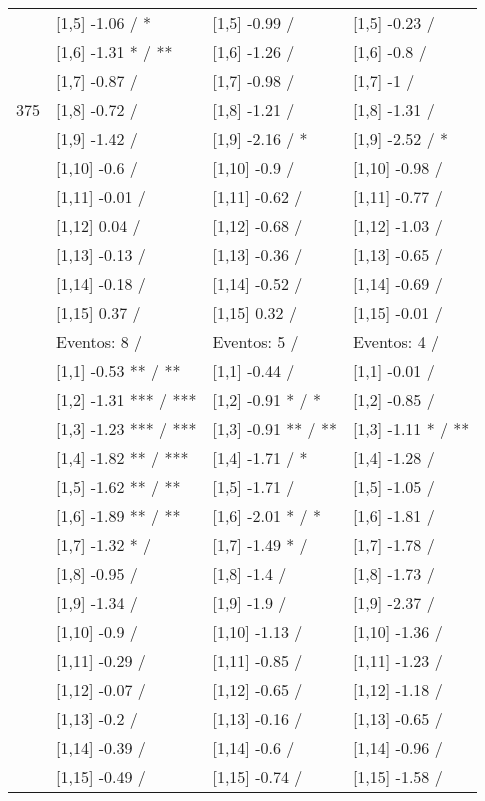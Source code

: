 \begin{table}
\begin{tabular}[t]{llll}
 & {}[1,5] -1.06  / * & {}[1,5] -0.99  / & {}[1,5] -0.23  /\\
 & {}[1,6] -1.31 * / ** & {}[1,6] -1.26  / & {}[1,6] -0.8  /\\
 & {}[1,7] -0.87  / & {}[1,7] -0.98  / & {}[1,7] -1  /\\
375 & {}[1,8] -0.72  / & {}[1,8] -1.21  / & {}[1,8] -1.31  /\\
\addlinespace
 & {}[1,9] -1.42  / & {}[1,9] -2.16  / * & {}[1,9] -2.52  / *\\
 & {}[1,10] -0.6  / & {}[1,10] -0.9  / & {}[1,10] -0.98  /\\
 & {}[1,11] -0.01  / & {}[1,11] -0.62  / & {}[1,11] -0.77  /\\
 & {}[1,12] 0.04  / & {}[1,12] -0.68  / & {}[1,12] -1.03  /\\
 & {}[1,13] -0.13  / & {}[1,13] -0.36  / & {}[1,13] -0.65  /\\
\addlinespace
 & {}[1,14] -0.18  / & {}[1,14] -0.52  / & {}[1,14] -0.69  /\\
 & {}[1,15] 0.37  / & {}[1,15] 0.32  / & {}[1,15] -0.01  /\\
 & Eventos:  8 / & Eventos:  5 / & Eventos:  4 /\\
 & {}[1,1] -0.53 ** / ** & {}[1,1] -0.44  / & {}[1,1] -0.01  /\\
 & {}[1,2] -1.31 *** / *** & {}[1,2] -0.91 * / * & {}[1,2] -0.85  /\\
\addlinespace
 & {}[1,3] -1.23 *** / *** & {}[1,3] -0.91 ** / ** & {}[1,3] -1.11 * / **\\
 & {}[1,4] -1.82 ** / *** & {}[1,4] -1.71  / * & {}[1,4] -1.28  /\\
 & {}[1,5] -1.62 ** / ** & {}[1,5] -1.71  / & {}[1,5] -1.05  /\\
 & {}[1,6] -1.89 ** / ** & {}[1,6] -2.01 * / * & {}[1,6] -1.81  /\\
 & {}[1,7] -1.32 * / & {}[1,7] -1.49 * / & {}[1,7] -1.78  /\\
\addlinespace
500 & {}[1,8] -0.95  / & {}[1,8] -1.4  / & {}[1,8] -1.73  /\\
 & {}[1,9] -1.34  / & {}[1,9] -1.9  / & {}[1,9] -2.37  /\\
 & {}[1,10] -0.9  / & {}[1,10] -1.13  / & {}[1,10] -1.36  /\\
 & {}[1,11] -0.29  / & {}[1,11] -0.85  / & {}[1,11] -1.23  /\\
 & {}[1,12] -0.07  / & {}[1,12] -0.65  / & {}[1,12] -1.18  /\\
\addlinespace
 & {}[1,13] -0.2  / & {}[1,13] -0.16  / & {}[1,13] -0.65  /\\
 & {}[1,14] -0.39  / & {}[1,14] -0.6  / & {}[1,14] -0.96  /\\
 & {}[1,15] -0.49  / & {}[1,15] -0.74  / & {}[1,15] -1.58  /\\
\bottomrule
\end{tabular}
\end{table}
